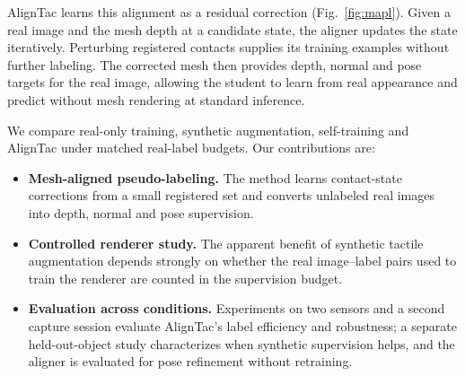 AlignTac learns this alignment as a residual correction (Fig.~\ref{fig:mapl}). Given a real image and the mesh depth at a candidate state, the aligner updates the state iteratively. Perturbing registered contacts supplies its training examples without further labeling. The corrected mesh then provides depth, normal and pose targets for the real image, allowing the student to learn from real appearance and predict without mesh rendering at standard inference.

We compare real-only training, synthetic augmentation, self-training and AlignTac under matched real-label budgets. Our contributions are:
\begin{itemize}
    \item \textbf{Mesh-aligned pseudo-labeling.} The method learns contact-state corrections from a small registered set and converts unlabeled real images into depth, normal and pose supervision.
    \item \textbf{Controlled renderer study.} The apparent benefit of synthetic tactile augmentation depends strongly on whether the real image--label pairs used to train the renderer are counted in the supervision budget.
    \item \textbf{Evaluation across conditions.} Experiments on two sensors and a second capture session evaluate AlignTac's label efficiency and robustness; a separate held-out-object study characterizes when synthetic supervision helps, and the aligner is evaluated for pose refinement without retraining.
\end{itemize}
